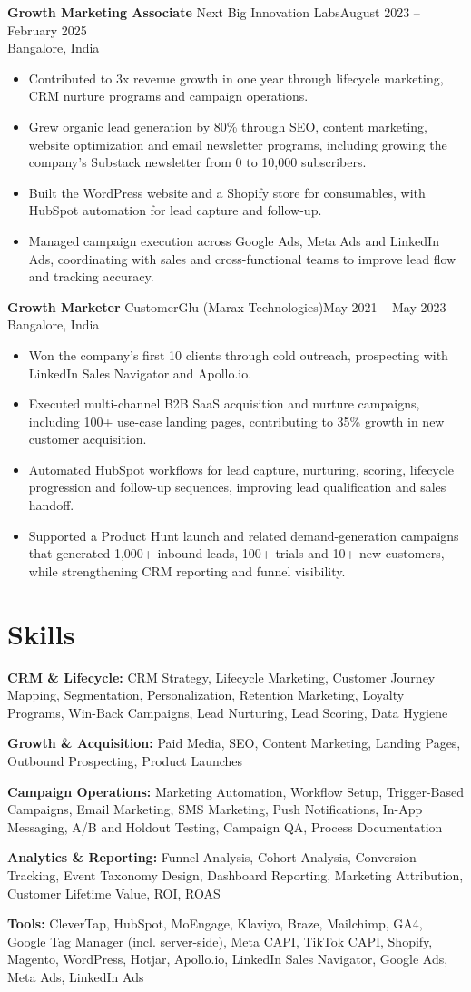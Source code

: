 \documentclass[10pt,a4paper]{article}
\newcommand{\jobheading}[4]{\vspace{3pt}\noindent\textbf{#2} \textbar{} #1\hfill{\footnotesize #4}\\[0.5pt]{\footnotesize #3}\par\vspace{1pt}}
\newcommand{\resumeliststart}{\begin{itemize}[leftmargin=*, itemsep=1pt, topsep=1pt, partopsep=0pt, parsep=0pt, after=\vspace{3pt}]}
\newcommand{\resumelistend}{\end{itemize}\vspace{1pt}}
\newcommand{\skillline}[2]{\textbf{#1:} #2\par\vspace{2pt}}
\begin{document}
\jobheading{Next Big Innovation Labs}{Growth Marketing Associate}{Bangalore, India}{August 2023 -- February 2025}
\resumeliststart
  \item Contributed to 3x revenue growth in one year through lifecycle marketing, CRM nurture programs and campaign operations.
  \item Grew organic lead generation by 80\% through SEO, content marketing, website optimization and email newsletter programs, including growing the company's Substack newsletter from 0 to 10,000 subscribers.
  \item Built the WordPress website and a Shopify store for consumables, with HubSpot automation for lead capture and follow-up.
  \item Managed campaign execution across Google Ads, Meta Ads and LinkedIn Ads, coordinating with sales and cross-functional teams to improve lead flow and tracking accuracy.
\resumelistend

\jobheading{CustomerGlu (Marax Technologies)}{Growth Marketer}{Bangalore, India}{May 2021 -- May 2023}
\resumeliststart
  \item Won the company's first 10 clients through cold outreach, prospecting with LinkedIn Sales Navigator and Apollo.io.
  \item Executed multi-channel B2B SaaS acquisition and nurture campaigns, including 100+ use-case landing pages, contributing to 35\% growth in new customer acquisition.
  \item Automated HubSpot workflows for lead capture, nurturing, scoring, lifecycle progression and follow-up sequences, improving lead qualification and sales handoff.
  \item Supported a Product Hunt launch and related demand-generation campaigns that generated 1{,}000+ inbound leads, 100+ trials and 10+ new customers, while strengthening CRM reporting and funnel visibility.
\resumelistend

\section*{Skills}
\skillline{CRM \& Lifecycle}{CRM Strategy, Lifecycle Marketing, Customer Journey Mapping, Segmentation, Personalization, Retention Marketing, Loyalty Programs, Win-Back Campaigns, Lead Nurturing, Lead Scoring, Data Hygiene}
\skillline{Growth \& Acquisition}{Paid Media, SEO, Content Marketing, Landing Pages, Outbound Prospecting, Product Launches}
\skillline{Campaign Operations}{Marketing Automation, Workflow Setup, Trigger-Based Campaigns, Email Marketing, SMS Marketing, Push Notifications, In-App Messaging, A/B and Holdout Testing, Campaign QA, Process Documentation}
\skillline{Analytics \& Reporting}{Funnel Analysis, Cohort Analysis, Conversion Tracking, Event Taxonomy Design, Dashboard Reporting, Marketing Attribution, Customer Lifetime Value, ROI, ROAS}
\skillline{Tools}{CleverTap, HubSpot, MoEngage, Klaviyo, Braze, Mailchimp, GA4, Google Tag Manager (incl. server-side), Meta CAPI, TikTok CAPI, Shopify, Magento, WordPress, Hotjar, Apollo.io, LinkedIn Sales Navigator, Google Ads, Meta Ads, LinkedIn Ads}
\end{document}

